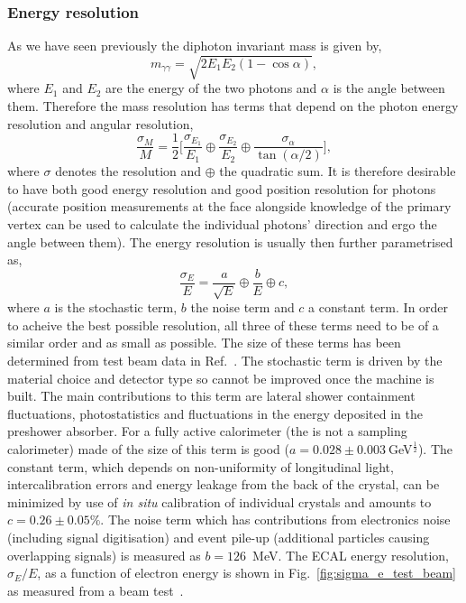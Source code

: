 \subsubsection{Energy resolution}
As we have seen previously the diphoton invariant mass is given by,
\begin{equation}
  m_{\gamma\gamma} = \sqrt{2E_{1}E_{2}(1-\cos\alpha)},
  \label{eq:dipho_inv_mass}
\end{equation}
where $E_{1}$ and $E_{2}$ are the energy of the two photons and $\alpha$ is the angle between them. Therefore the mass resolution has terms that depend on the photon energy resolution and angular resolution,
\begin{equation}
  \frac{\sigma_{M}}{M} = \frac{1}{2} \Biggl[ \frac{\sigma_{E_{1}}}{E_{1}} \oplus \frac{\sigma_{E_{2}}}{E_{2}} \oplus \frac{\sigma_{\alpha}}{\tan(\alpha/2)} \Biggr],
  \label{eq:mass_res}
\end{equation}
where $\sigma$ denotes the resolution and $\oplus$ the quadratic sum. It is therefore desirable to have both good energy resolution and good position resolution for photons (accurate position measurements at the \ECAL face alongside knowledge of the primary vertex can be used to calculate the individual photons' direction and ergo the angle between them). The energy resolution is usually then further parametrised as,
\begin{equation}
  \frac{\sigma_{E}}{E} = \frac{a}{\sqrt{E}} \oplus \frac{b}{E} \oplus c,
  \label{eq:energy_res}
\end{equation}
where $a$ is the stochastic term, $b$ the noise term and $c$ a constant term. In order to acheive the best possible resolution, all three of these terms need to be of a similar order and as small as possible. The size of these terms has been determined from test beam data in Ref.~\cite{CMS_JINST}. The stochastic term is driven by the material choice and detector type so cannot be improved once the machine is built. The main contributions to this term are lateral shower containment fluctuations, photostatistics and fluctuations in the energy deposited in the preshower absorber. For a fully active calorimeter (the \CMS \ECAL is not a sampling calorimeter) made of \PbWO the size of this term is good ($a=0.028\pm0.003~$GeV$^{\frac{1}{2}}$). The constant term, which depends on non-uniformity of longitudinal light, intercalibration errors and energy leakage from the back of the crystal, can be minimized by use of \emph{in situ} calibration of individual crystals and amounts to $c=0.26\pm0.05\%$. The noise term which has contributions from electronics noise (including signal digitisation) and event pile-up (additional particles causing overlapping signals) is measured as $b=126$~MeV. The ECAL energy resolution, $\sigma_{E}/E$, as a function of electron energy is shown in Fig.~\ref{fig:sigma_e_test_beam} as measured from a beam test~\cite{CMS_JINST}. 

